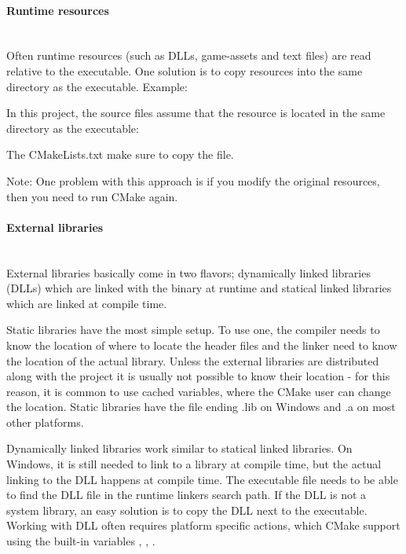 \documentclass[11pt,a4paper,landscape]{scrartcl} %
\newcommand{\sectiontitle}[1]{\paragraph{#1} \ \\} %
\begin{document}
\begin{multicols}{2}


\sectiontitle{Runtime resources}

Often runtime resources (such as DLLs, game-assets and text files) are read relative to the executable. One solution is to copy resources into the same directory as the executable. Example:

\vspace{\baselineskip} %
\noindent{}

In this project, the source files assume that the resource is located in the same directory as the executable:



The CMakeLists.txt make sure to copy the file. 



Note: One problem with this approach is if you modify the original resources, then you need to run CMake again.

\sectiontitle{External libraries}

External libraries basically come in two flavors; dynamically linked libraries (DLLs) which are linked with the binary at runtime and statical linked libraries which are linked at compile time.

Static libraries have the most simple setup. To use one, the compiler needs to know the location of where to locate the header files and the linker need to know the location of the actual library. Unless the external libraries are distributed along with the project it is usually not possible to know their location - for this reason, it is common to use cached variables, where the CMake user can change the location. Static libraries have the file ending .lib on Windows and .a on most other platforms. 



Dynamically linked libraries work similar to statical linked libraries. On Windows, it is still needed to link to a library at compile time, but the actual linking to the DLL happens at compile time. The executable file needs to be able to find the DLL file in the runtime linkers search path. If the DLL is not a system library, an easy solution is to copy the DLL next to the executable. Working with DLL often requires platform specific actions, which CMake support using the built-in variables , , .


\end{multicols}
\end{document}
